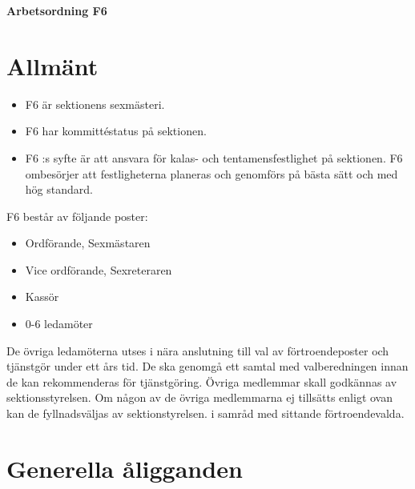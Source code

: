 

\renewcommand{\dateseparator}{-} %

\renewcommand{\forening}{F6 }

\begin{center}
\LARGE{\textbf{Arbetsordning F6}}
\end{center}


\section{Allmänt}
\begin{itemize}

\item \forening är sektionens sexmästeri. 

\item \forening har kommittéstatus på sektionen.

\item \forening :s syfte är att ansvara för kalas- och tentamensfestlighet på sektionen. \forening ombesörjer att festligheterna planeras och genomförs på bästa sätt och med hög standard. 
\end{itemize}
\forening består av följande poster:
\begin{itemize}
\item Ordförande, Sexmästaren
\item Vice ordförande, Sexreteraren
\item Kassör
\item 0-6 ledamöter
\end{itemize}

De övriga ledamöterna utses i nära anslutning till val av förtroendeposter och tjänstgör under ett års tid. De ska genomgå ett samtal med valberedningen innan de kan rekommenderas för tjänstgöring. Övriga medlemmar skall godkännas av sektionsstyrelsen. Om någon av de övriga medlemmarna ej tillsätts enligt ovan kan de fyllnadsväljas av sektionstyrelsen. 
i samråd med sittande förtroendevalda.

\section{Generella åligganden}

